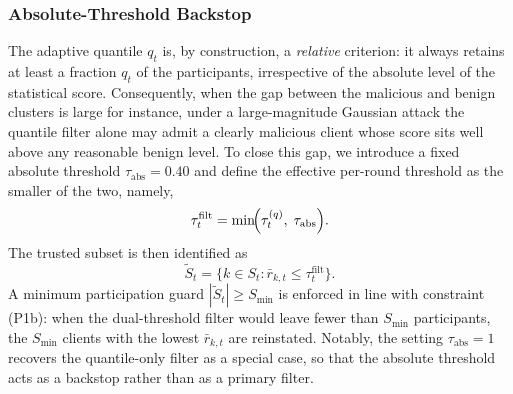 \documentclass[journal]{IEEEtran}
\begin{document}
\subsubsection{Absolute-Threshold Backstop}
The adaptive quantile $q_t$ is, by construction, a \emph{relative} criterion: it always retains at least a fraction $q_t$ of the participants, irrespective of the absolute level of the statistical score. Consequently, when the gap between the malicious and benign clusters is large for instance, under a large-magnitude Gaussian attack the quantile filter alone may admit a clearly malicious client whose score sits well above any reasonable benign level. To close this gap, we introduce a fixed absolute threshold $\tau_{\mathrm{abs}} = 0.40$ and define the effective per-round threshold as the smaller of the two, namely,
\begin{equation}
\tau_t^{\mathrm{filt}} = \min\!\Bigl(\tau_t^{(q)},\; \tau_{\mathrm{abs}}\Bigr).
\label{eq:dual_thresh}
\end{equation}
The trusted subset is then identified as
\begin{equation}
\widetilde{S}_t = \bigl\{k \in S_t : \bar r_{k,t} \le \tau_t^{\mathrm{filt}}\bigr\}.
\label{eq:filtered_set}
\end{equation}
A minimum participation guard $|\widetilde{S}_t| \ge S_{\min}$ is enforced in line with constraint (P1b): when the dual-threshold filter would leave fewer than $S_{\min}$ participants, the $S_{\min}$ clients with the lowest $\bar r_{k,t}$ are reinstated. Notably, the setting $\tau_{\mathrm{abs}}=1$ recovers the quantile-only filter as a special case, so that the absolute threshold acts as a backstop rather than as a primary filter.
\end{document}
